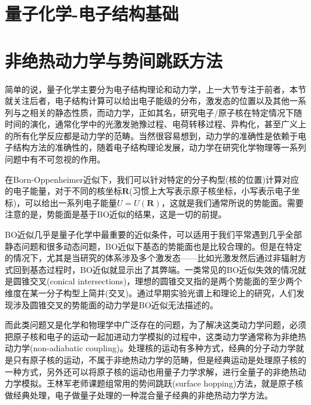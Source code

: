 \documentclass{article}
\numberwithin{equation}{section}
\begin{document}
  \section{量子化学-电子结构基础}

    \section{非绝热动力学与势间跳跃方法}
    简单的说，量子化学主要分为电子结构理论和动力学，上一大节专注于前者，本节就关注后者，电子结构计算可以给出电子能级的分布，激发态的位置以及其他一系列与之相关的静态性质，而动力学，正如其名，研究电子/原子核在特定情况下随时间的演化，通常化学中的光激发驰豫过程、电荷转移过程、异构化，甚至广义上的所有化学反应都是动力学的范畴。当然很容易想到，动力学的准确性是依赖于电子结构方法的准确性的，随着电子结构理论发展，动力学在研究化学物理等一系列问题中有不可忽视的作用。

    在Born-Oppenheimer近似下，我们可以针对特定的分子构型(核的位置)计算对应的电子能量，对于不同的核坐标$\mathbf{R}$(习惯上大写表示原子核坐标，小写表示电子坐标)，可以给出一系列电子能量$U=U(\mathbf{R})$，这就是我们通常所说的势能面。需要注意的是，势能面是基于BO近似的结果，这是一切的前提。
    
    BO近似几乎是量子化学中最重要的近似条件，可以适用于我们平常遇到几乎全部静态问题和很多动态问题，BO近似下基态的势能面也是比较合理的。但是在特定的情况下，尤其是当研究的体系涉及多个激发态——比如光激发然后通过非辐射方式回到基态过程时，BO近似就显示出了其弊端。一类常见的BO近似失效的情况就是圆锥交叉(conical intersections)，理想的圆锥交叉指的是两个势能面的至少两个维度在某一分子构型上简并(交叉)。通过早期实验光谱上和理论上的研究，人们发现涉及圆锥交叉的势能面的动力学是BO近似无法描述的。
    
    而此类问题又是化学和物理学中广泛存在的问题，为了解决这类动力学问题，必须把原子核和电子的运动一起加进动力学模拟的过程中，这类动力学通常称为非绝热动力学(non-adiabatic coupling)。处理核的运动有多种方式，经典的分子动力学就是只有原子核的运动，不属于非绝热动力学的范畴，但是经典运动是处理原子核的一种方式，另外还可以将原子核的运动也用量子力学求解，进行全量子的非绝热动力学模拟。王林军老师课题组常用的势间跳跃(surface hopping)方法，就是原子核做经典处理，电子做量子处理的一种混合量子经典的非绝热动力学方法。
\end{document}
